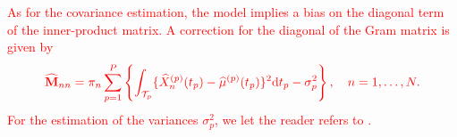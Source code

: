 \textcolor{red}{As for the covariance estimation, the model implies a bias on the diagonal term of the inner-product matrix. A correction for the diagonal of the Gram matrix is given by}
\begin{equation}
    \textcolor{red}{\widehat{\mathbf{M}}_{nn} = \pi_n\sum_{p = 1}^P \left\{\int_{\mathcal{T}_{p}}\{\widehat{X}_n^{(p)}(t_p) - \widehat{\mu}^{(p)}(t_p)\}^2 {\rm d} t_p - \sigma_p^2 \right\}, \quad n = 1, \dots, N.}
\end{equation}
\textcolor{red}{For the estimation of the variances $\sigma_p^2$, we let the reader refers to \cite{hallVarianceEstimationNonparametric1990,hallAsymptoticallyOptimalDifferenceBased1990}.}


